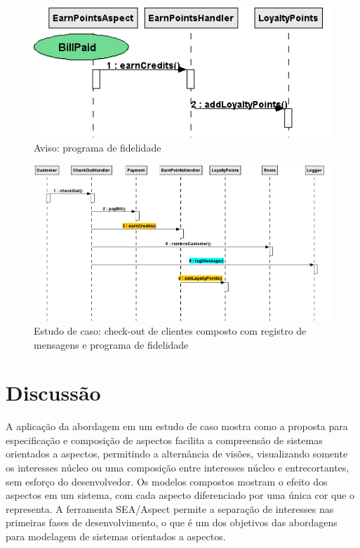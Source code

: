   \begin{figure}
	\centering
	\includegraphics{img/case_study_behavioral_loyalty_points.png}
	\caption{Aviso: programa de fidelidade}\label{fig:case_study_behavioral_loyalty_points}
  \end{figure}

  \begin{landscape}
  \begin{figure}[tb]
	\centering
	\includegraphics[scale=0.7]{img/case_study_2_compound.png}
	\caption{Estudo de caso: check-out de clientes composto com registro de mensagens e programa de fidelidade}\label{fig:case_study_2_compound}
  \end{figure}
\end{landscape}
  
\section{Discussão}

A aplicação da abordagem em um estudo de caso mostra como a proposta para especificação e composição de aspectos facilita a compreensão de
sistemas orientados a aspectos, permitindo a alternância de visões, visualizando somente os interesses núcleo ou uma composição entre interesses núcleo e entrecortantes, 
sem esforço do desenvolvedor. Os modelos compostos mostram o efeito dos aspectos em um sistema, com cada aspecto diferenciado por uma única cor que o
representa. A ferramenta SEA/Aspect permite a separação de interesses nas primeiras fases de desenvolvimento, o que é um dos objetivos das abordagens para modelagem
de sistemas orientados a aspectos.
